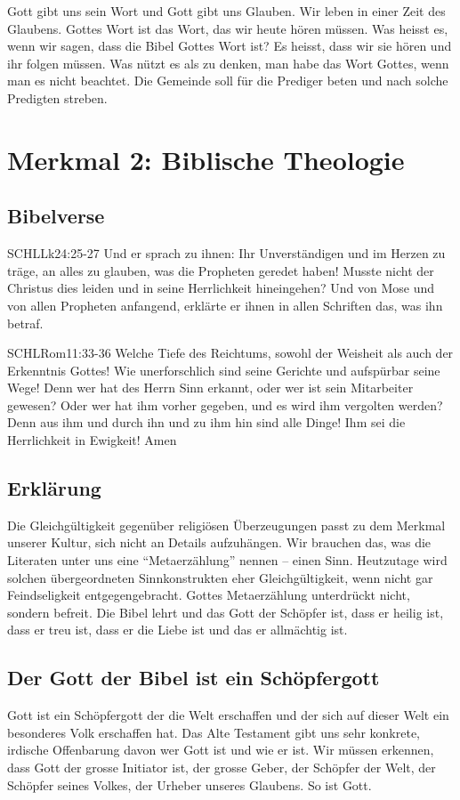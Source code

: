 \documentclass{../../inc/mybib}
\begin{document}
Gott gibt uns sein Wort und Gott gibt uns Glauben. Wir leben in einer Zeit des Glaubens. Gottes Wort ist das Wort, das wir heute hören müssen. Was heisst es, wenn wir sagen, dass die Bibel Gottes Wort ist? Es heisst, dass wir sie hören und ihr folgen müssen. Was nützt es als zu denken, man habe das Wort Gottes, wenn man es nicht beachtet. Die Gemeinde soll für die Prediger beten und nach solche Predigten streben.
\section{Merkmal 2: Biblische Theologie}
\subsection{Bibelverse}
\begin{bibelbox}{SCHL}{Lk}{24:25-27}
    Und er sprach zu ihnen: Ihr Unverständigen und im Herzen zu träge, an alles zu glauben, was die Propheten geredet haben! Musste nicht der Christus dies leiden und in seine Herrlichkeit hineingehen? Und von Mose und von allen Propheten anfangend, erklärte er ihnen in allen Schriften das, was ihn betraf.
\end{bibelbox}
\begin{bibelbox}{SCHL}{Rom}{11:33-36}
    Welche Tiefe des Reichtums, sowohl der Weisheit als auch der Erkenntnis Gottes! Wie unerforschlich sind seine Gerichte und aufspürbar seine Wege! Denn wer hat des Herrn Sinn erkannt, oder wer ist sein Mitarbeiter gewesen? Oder wer hat ihm vorher gegeben, und es wird ihm vergolten werden? Denn aus ihm und durch ihn und zu ihm hin sind alle Dinge! Ihm sei die Herrlichkeit in Ewigkeit! Amen
\end{bibelbox}
\subsection{Erklärung}
Die Gleichgültigkeit gegenüber religiösen Überzeugungen passt zu dem Merkmal unserer Kultur, sich nicht an Details aufzuhängen. Wir brauchen das, was die Literaten unter uns eine \enquote{Metaerzählung} nennen -- einen Sinn. Heutzutage wird solchen übergeordneten Sinnkonstrukten eher Gleichgültigkeit, wenn nicht gar Feindseligkeit entgegengebracht.
Gottes Metaerzählung unterdrückt nicht, sondern befreit. Die Bibel lehrt und das Gott der Schöpfer ist, dass er heilig ist, dass er treu ist, dass er die Liebe ist und das er allmächtig ist.
\subsection{Der Gott der Bibel ist ein Schöpfergott}
Gott ist ein Schöpfergott der die Welt erschaffen und der sich auf dieser Welt ein besonderes Volk erschaffen hat. Das Alte Testament gibt uns sehr konkrete, irdische Offenbarung davon wer Gott ist und wie er ist. Wir müssen erkennen, dass Gott der grosse Initiator ist, der grosse Geber, der Schöpfer der Welt, der Schöpfer seines Volkes, der Urheber unseres Glaubens. So ist Gott.
\end{document}
